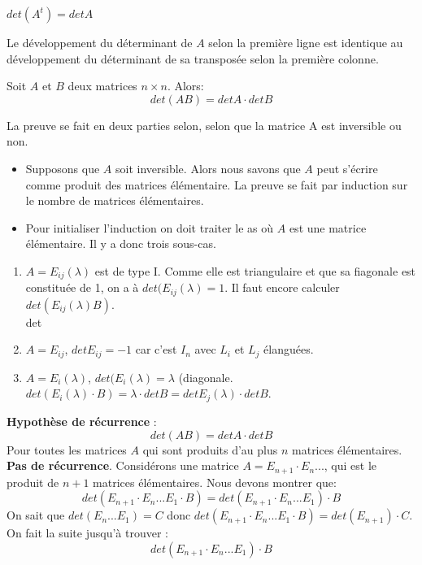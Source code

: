 \documentclass[11pt]{book}
\begin{document}
    \begin{theoreme}
        $det(A^t) = detA$
    \end{theoreme}
    \begin{preuve}
        Le développement du déterminant de $A$ selon la première ligne est identique au développement du déterminant de sa transposée selon la première colonne.
    \end{preuve}
    \begin{thm}
        Soit $A$ et $B$ deux matrices $n\times n$. Alors: 
        \\
        \[det(AB) = detA \cdot det B\]

    \end{thm}
    \begin{preuve}
        La preuve se fait en deux parties selon, selon que la matrice A est inversible ou non. 
        \begin{itemize}
            \item Supposons que $A$ soit inversible. Alors nous savons que $A$ peut s'écrire comme produit des matrices élémentaire. La preuve se fait par induction sur le nombre de matrices élémentaires.
            \item Pour initialiser l'induction on doit traiter le as où $A$ est une matrice élémentaire. Il y a donc trois sous-cas.

        \end{itemize}
    \end{preuve}
    \begin{enumerate}
        \item $A = E_{ij}(\lambda)$ est de type I. Comme elle est triangulaire et que sa fiagonale est constituée de 1, on a à $det(E_{ij}(\lambda) = 1$. Il faut encore calculer $det(E_{ij}(\lambda)B)$. \\ det
        \item $A = E_{ij}$, $det E_{ij} = -1$ car c'est $I_n$ avec $L_i$ et $L_j$ élanguées.
        \item $A = E_i(\lambda)$, $det(E_i(\lambda) = \lambda$ (diagonale. $det(E_i(\lambda)\cdot B) = \lambda \cdot detB = det E_{j}(\lambda)\cdot det B$.


    \end{enumerate}
    \textbf{Hypothèse de récurrence} : \[ det(AB) = det A \cdot det B\]
    Pour toutes les matrices $A$ qui sont produits d'au plus $n$ matrices élémentaires.
    \\
    \textbf{Pas de récurrence}. Considérons une matrice $A = E_{n+1} \cdot E_n ...$, qui est le produit de $n + 1$ matrices élémentaires. Nous devons montrer que:
    \[
    det(E_{n+1}\cdot E_n ... E_1 \cdot B) =  det(E_{n+1}\cdot E_n ... E_1)\cdot B    \]
    On sait que $det( E_n ... E_1) = C$ donc $det(E_{n+1}\cdot E_n ... E_1 \cdot B) = det(E_{n+1}) \cdot C$.
    On fait la suite jusqu'à trouver : \[
    det(E_{n+1}\cdot E_n ... E_1)\cdot B
    \]
\end{document}
